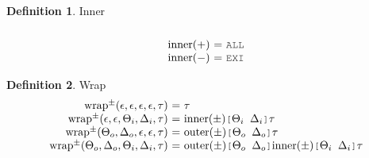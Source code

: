 \documentclass[acmsmall]{acmart}
\theoremstyle{definition}
\newtheorem{definition}{Definition}[section]
\begin{document}
\begin{definition}
  Inner
  \hfill
  \\
  \[\begin{array}[t]{r@{}c@{}lcl}
    \\
    \text{inner}(+) 
    &\ =\ & 
    \J{ALL} 
    \\
    \text{inner}(-) 
    &\ =\ & 
    \J{EXI} 
  \end{array}\]
\end{definition}

\begin{definition}
  Wrap
  \hfill
  \\
  \[
  \begin{array}[t]{r@{}c@{}lcl}
    \text{wrap}^{\pm}(\epsilon, \epsilon, \epsilon, \epsilon, \tau) 
    &\ =\ & 
    \tau
    \\
    \text{wrap}^{\pm}(\epsilon, \epsilon, \Theta_i, \Delta_i, \tau) 
    &\ =\ & 
    \text{inner}(\pm)\J{[}\Theta_i\J{ }\Delta_i\J{]}\tau
    \\
    \text{wrap}^{\pm}(\Theta_o, \Delta_o, \epsilon, \epsilon, \tau) 
    &\ =\ & 
    \text{outer}(\pm)\J{[}\Theta_o\J{ }\Delta_o\J{]}\tau
    \\
    \text{wrap}^{\pm}(\Theta_o, \Delta_o, \Theta_i, \Delta_i, \tau) 
    &\ =\ & 
    \text{outer}(\pm)\J{[}\Theta_o\J{ }\Delta_o\J{]}
    \text{inner}(\pm)\J{[}\Theta_i\J{ }\Delta_i\J{]}
    \tau
  \end{array}\]
\end{definition}
\end{document}
